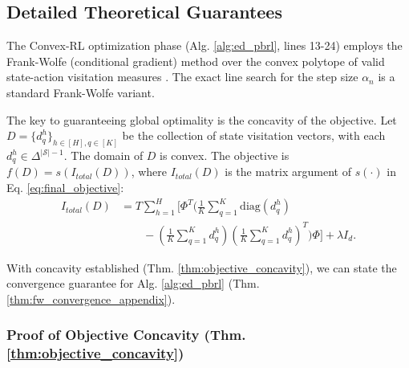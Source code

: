 \documentclass{article}
\newcommand{\mS}{\mathcal{S}}
\begin{document}
\subsection{Detailed Theoretical Guarantees}
\label{sec:appendix_detailed_guarantees}

The Convex-RL optimization phase (Alg. \ref{alg:ed_pbrl}, lines 13-24) employs the Frank-Wolfe (conditional gradient) method over the convex polytope of valid state-action visitation measures \cite{puterman2014markov, frank1956algorithm, pmlr-v28-jaggi13}. The exact line search for the step size $\alpha_n$ is a standard Frank-Wolfe variant.

The key to guaranteeing global optimality is the concavity of the objective. Let $D = \{d^h_q\}_{h \in [H], q \in [K]}$ be the collection of state visitation vectors, with each $d^h_q \in \Delta^{|\mS|-1}$. The domain of $D$ is convex. The objective is $f(D) = s(I_{total}(D))$, where $I_{total}(D)$ is the matrix argument of $s(\cdot)$ in Eq. \ref{eq:final_objective}:
\begin{align*}
I_{total}(D)
&= T \sum_{h=1}^H \Bigg[ \Phi^T \Bigg(
\frac{1}{K} \sum_{q=1}^K \mathrm{diag}(d^h_q) \\
&\qquad - \left(\frac{1}{K}\sum_{q=1}^K d^h_q\right)
\left(\frac{1}{K}\sum_{q=1}^K d^h_q\right)^T
\Bigg) \Phi \Bigg] + \lambda I_d.
\end{align*}

With concavity established (Thm. \ref{thm:objective_concavity}), we can state the convergence guarantee for Alg. \ref{alg:ed_pbrl} (Thm. \ref{thm:fw_convergence_appendix}).

\subsubsection{Proof of Objective Concavity (Thm. \ref{thm:objective_concavity})}
\label{proof:objective_concavity_full}

\thmObjectiveConcavityRestateLabel*
\end{document}

